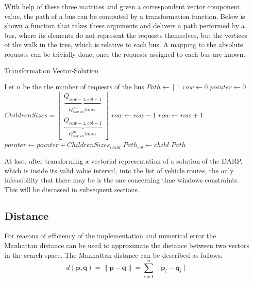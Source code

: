 \documentclass[tuberlin,cic,tc,openright,english,noabntcite,oneside]{iiufrgs}
\begin{document}
With help of these three matrices and given a correspondent vector component value, the path of a bus can be computed by a transformation function. Below is shown a function that takes these arguments and delivers a path performed by a bus, where its elements do not represent the requests themselves, but the vertices of the walk in the tree, which is relative to each bus. A mapping to the absolute requests can be trivially done, once the requests assigned to each bus are known.
\begin{algorithm}[H]
\caption{Transformation Vector-Solution}
\begin{algorithmic}
\State Let $n$ be the the number of requests of the bus
\State $Path \gets [ ]$
\State $row \gets 0$
\State $pointer \gets 0$
	\State $\displaystyle ChildrenSizes = \begin{bmatrix}\underbrace{Q_{row-1,col+1}}_{Q^{out}_{row,col} times}
			\\ \underbrace{Q_{row+1,col+1}}_{Q^{in}_{row,col} times}\end{bmatrix}$
				\State $row \gets row - 1$
			\Else
				\State $row \gets row + 1$
			\EndIf
		\Else
			\State $pointer \gets pointer + ChildrenSizes_{child}$
		\EndIf
	\EndFor
	\State $Path_{col} \gets child$
\EndFor
\State \Return $Path$
\EndFunction
\end{algorithmic}
\end{algorithm}

At last, after transforming a vectorial representation of a solution of the DARP, which is inside its valid value interval, into the list of vehicle routes, the only infeasibility that there may be is the one concerning time windows constraints. This will be discussed in subsequent sections.

\subsection{Distance}
For reasons of efficiency of the implementation and numerical error the Manhattan distance can be used to approximate the distance between two vectors in the search space. The Manhattan distance can be described as follows.
$$d(\mathbf{p},\mathbf{q}) = \parallel \mathbf{p} - \mathbf{q} \parallel = \sum_{i=1}^{n} \mid \mathbf{p}_{i}-\mathbf{q}_{i} \mid$$
\end{document}
